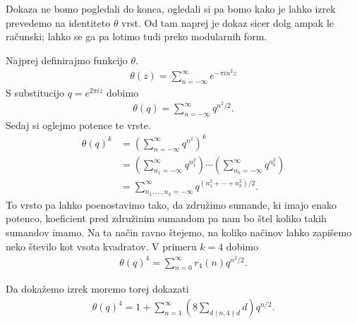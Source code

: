 \begin{dokaz}
    Dokaza ne bomo pogledali do konca, ogledali si pa bomo kako je lahko izrek prevedemo na identiteto \(\theta\) vrst\cite{kato3}. Od tam naprej je dokaz sicer dolg ampak le računski\cite{Hirschhorn_1982}; lahko se ga pa lotimo tudi preko modularnih form\cite{kato3}.

    Najprej definirajmo funkcijo \(\theta\).
    \begin{align*}
        \theta(z) = \sum_{n=-\infty}^\infty e^{-\pi i n^2 z}
    \end{align*}
    S substitucijo \(q = e^{2\pi i z}\) dobimo
    \begin{align*}
        \theta(q) = \sum_{n=-\infty}^\infty q^{n^2/2}.
    \end{align*}
    Sedaj si oglejmo potence te vrste.
    \begin{align*}
        \theta(q)^k & = \left(\sum_{n=-\infty}^\infty q^{n^2}\right)^k                                                           \\
                    & = \left(\sum_{n_1=-\infty}^\infty q^{n_1^2}\right) \cdots \left(\sum_{n_k=-\infty}^\infty q^{n_k^2}\right) \\
                    & = \sum_{n_1, \ldots, n_k = -\infty}^\infty q^{(n_1^2 + \cdots + n_k^2)/2}.
    \end{align*}
    To vrsto pa lahko poenostavimo tako, da združimo sumande, ki imajo enako potenco, koeficient pred združinim sumandom pa nam bo štel koliko takih sumandov imamo. Na ta način ravno štejemo, na koliko načinov lahko zapišemo neko število kot vsota kvadratov. V primeru \(k=4\) dobimo
    \begin{align*}
        \theta(q)^4 = \sum_{n=0}^\infty r_4(n) q^{n^2/2}.
    \end{align*}

    Da dokažemo izrek moremo torej dokazati
    \begin{align*}
        \theta(q)^4 = 1+\sum_{n=1}^\infty \left(8\sum_{d\mid n, 4\nmid d} d \right) q^{n/2}.
    \end{align*}


\end{dokaz}
